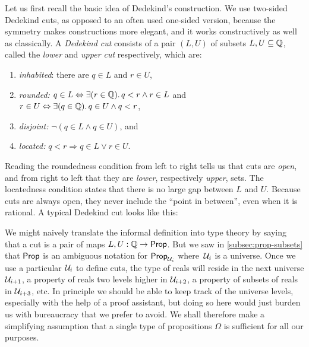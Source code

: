Let us first recall the basic idea of Dedekind's construction. We use two-sided Dedekind
cuts, as opposed to an often used one-sided version, because the symmetry makes
constructions more elegant, and it works constructively as well as classically. A
\emph{Dedekind cut} consists of a pair $(L, U)$ of subsets $L, U \subseteq \mathbb{Q}$, called the
\emph{lower} and \emph{upper cut} respectively, which are:
% 
\begin{enumerate}
\item \emph{inhabited}: there are $q \in L$ and $r \in U$,
\item \emph{rounded:} $q \in L \Leftrightarrow \exis {r \in \Q} q < r \land r \in L$
  and $r \in U \Leftrightarrow \exis {q \in \Q} q \in U \land q < r$,
\item \emph{disjoint:} $\lnot (q \in L \land q \in U)$, and
\item \emph{located:} $q < r \Rightarrow q \in L \lor r \in U$.
\end{enumerate}
%
Reading the roundedness condition from left to right tells us that cuts are \emph{open},
and from right to left that they are \emph{lower}, respectively \emph{upper}, sets. The
locatedness condition states that there is no large gap between $L$ and $U$. Because cuts
are always open, they never include the ``point in between'', even when it is rational. A
typical Dedekind cut looks like this:
%
\begin{center}
\end{center}
%
We might naively translate the informal definition into type theory by saying that a cut
is a pair of maps $L, U : \mathbb{Q} \to \mathsf{Prop}$. But we saw in \autoref{subsec:prop-subsets} that
$\mathsf{Prop}$ is an ambiguous notation for $\mathsf{Prop}_{\mathcal{U}_i}$ where~$\mathcal{U}_i$ is a universe. Once we
use a particular $\mathcal{U}_i$ to define cuts, the type of reals will reside in the next
universe $\mathcal{U}_{i+1}$, a property of reals two levels higher in $\mathcal{U}_{i+2}$, a property of
subsets of reals in $\mathcal{U}_{i+3}$, etc. In principle we should be able to keep track of the
universe levels, especially with the help of a proof assistant, but doing so here would
just burden us with bureaucracy that we prefer to avoid. We shall therefore make a
simplifying assumption that a single type of propositions $\Omega$ is sufficient for all
our purposes.

